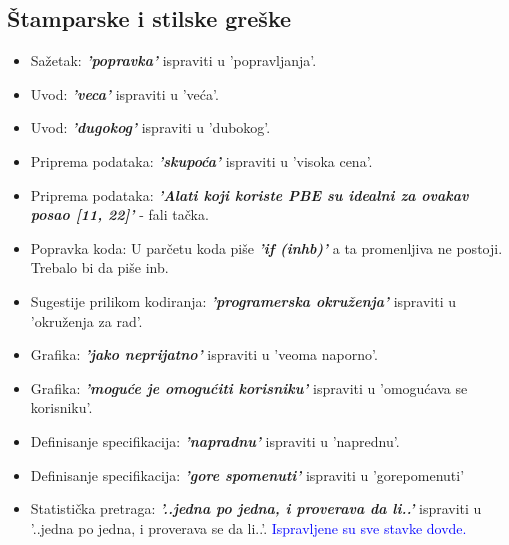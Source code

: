 \documentclass[a4paper]{report}
\newcommand{\odgovor}[1]{\textcolor{blue}{#1}}
\begin{document}
\subsection{Štamparske i stilske greške}
\begin{itemize}
	\item Sažetak: \textbf{\textit{'popravka'}} ispraviti u 'popravljanja'.
	\item Uvod: \textbf{\textit{'veca'}} ispraviti u 'veća'.
    \item Uvod: \textbf{\textit{'dugokog'}} ispraviti u 'dubokog'.
    \item Priprema podataka: \textbf{\textit{'skupoća'}} ispraviti u 'visoka cena'.
    \item Priprema podataka: \textbf{\textit{'Alati koji koriste PBE su idealni za ovakav posao [11, 22]'}} - fali tačka.
    \item Popravka koda: U parčetu koda piše \textbf{\textit{'if (inhb)'}} a ta promenljiva ne postoji. Trebalo bi da piše inb.
    \item Sugestije prilikom kodiranja: \textbf{\textit{'programerska okruženja'}} ispraviti u 'okruženja za rad'.
    \item Grafika: \textbf{\textit{'jako neprijatno'}} ispraviti u 'veoma naporno'.
    \item Grafika: \textbf{\textit{'moguće je omogućiti korisniku'}} ispraviti u 'omogućava se korisniku'.
    \item Definisanje specifikacija: \textbf{\textit{'napradnu'}} ispraviti u 'naprednu'.
    \item Definisanje specifikacija: \textbf{\textit{'gore spomenuti'}} ispraviti u 'gorepomenuti'
    \item Statistička pretraga: \textbf{\textit{'..jedna po jedna, i proverava da li..'}} ispraviti u '..jedna po jedna, i proverava se da li..'.
    \odgovor {Ispravljene su sve stavke dovde.}


\end{itemize}
\end{document}
